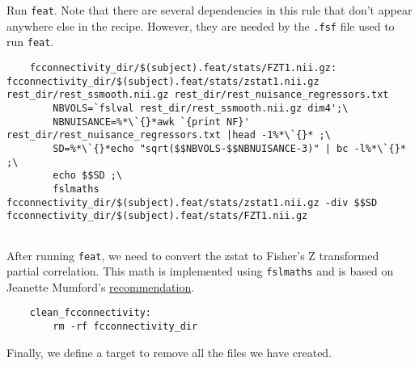 Run \texttt{feat}. Note that there are several dependencies in this
rule that don't appear anywhere else in the recipe. However, they are
needed by the \texttt{.fsf} file used to run \texttt{feat}.

\begin{lstlisting}
	fcconnectivity_dir/$(subject).feat/stats/FZT1.nii.gz: fcconnectivity_dir/$(subject).feat/stats/zstat1.nii.gz rest_dir/rest_ssmooth.nii.gz rest_dir/rest_nuisance_regressors.txt 
		NBVOLS=`fslval rest_dir/rest_ssmooth.nii.gz dim4';\
		NBNUISANCE=%*\`{}*awk `{print NF}' rest_dir/rest_nuisance_regressors.txt |head -1%*\`{}* ;\
		SD=%*\`{}*echo "sqrt($$NBVOLS-$$NBNUISANCE-3)" | bc -l%*\`{}* ;\
		echo $$SD ;\
		fslmaths fcconnectivity_dir/$(subject).feat/stats/zstat1.nii.gz -div $$SD fcconnectivity_dir/$(subject).feat/stats/FZT1.nii.gz 
		
\end{lstlisting}

After running \texttt{feat}, we need to convert the zstat to Fisher's
Z transformed partial correlation. This math is implemented using
\texttt{fslmaths} and is based on Jeanette Mumford's \href{http://mumfordbrainstats.tumblr.com/post/125523326931/how-to-convert-zstat-images-to-fishers-z}{recommendation}.  

\begin{lstlisting}
	clean_fcconnectivity:
		rm -rf fcconnectivity_dir
\end{lstlisting}

Finally, we define a target to remove all the files we have created.


